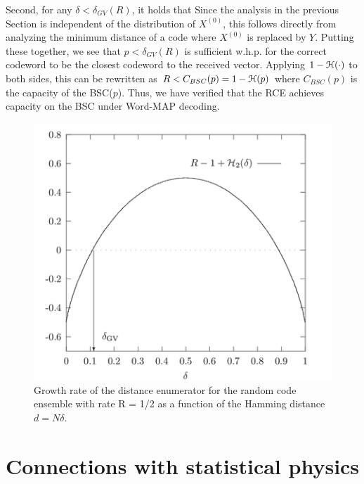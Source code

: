 \documentclass[letterpaper,english,10pt]{article}
\begin{document}
Second, for any $\delta < \delta_{GV}(R)$, it holds that 
Since the analysis in the previous Section is independent of the distribution of $X^{(0)}$, 
this follows directly from analyzing the minimum distance of a code where $X^{(0)}$ is replaced by $Y$. 
Putting these together, we see that $p < \delta_{GV}(R)$ is sufficient w.h.p. for the correct codeword to be the closest codeword to the received vector. 
Applying $1 - \mathcal{H}(\cdot)$ to both sides, 
this can be rewritten as $R < C_{BSC}(p) = 1- \mathcal{H}(p)$ where $C_{BSC}(p)$ is the capacity of the BSC($p$). 
Thus, we have verified that the RCE achieves capacity on the BSC under Word-MAP decoding.
\begin{figure}
    \centering
    \includegraphics[scale=0.6]{Figures/RCE.png}
    \caption{Growth rate of the distance enumerator for the random code ensemble
with rate R = 1/2 as a function of the Hamming distance $d = N\delta$.}
    \label{fig:my_label}
\end{figure}

\section{Connections with statistical physics}
\end{document}
